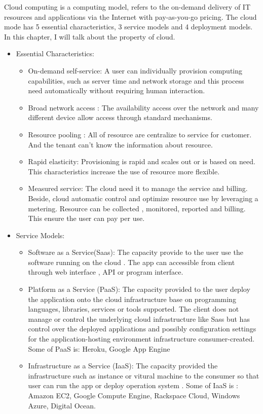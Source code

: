 
Cloud computing is a computing model, refers to the on-demand delivery of IT resources and applications via the Internet with pay-as-you-go pricing. The cloud mode has 5 essential characteristics, 3 service models and 4 deployment models. In this chapter, I will talk about the property of cloud. 
\begin{itemize}
	\item Essential Characteristics:
		\begin{itemize}
			\item On-demand self-service: A user can individually provision computing capabilities, such as server time and network storage and this process need automatically without requiring human interaction.
			\item Broad network access : The availability access over the network and many different device allow access through standard mechanisms. 
			\item Resource pooling : All of resource are centralize to service for customer. And the tenant can’t know the information about resource.
			\item Rapid elasticity: Provisioning is rapid and scales out or is based on need. This characteristics increase the use of resource more flexible. 
			\item Measured service: The cloud need it to manage the service and billing. Beside, cloud automatic control and optimize resource use by leveraging a metering. Resource can be collected , monitored, reported and billing. This ensure the user can pay per use. 
		\end{itemize}

\item Service Models:
	\begin{itemize}
		\item Software as a Service(Saas): The capacity provide to the user use the software running on the cloud . The app can  accessible from client through web interface , API or program interface.
		\item Platform as a Service (PaaS): The capacity provided to the user deploy the application onto the cloud infrastructure base on  programming languages, libraries, services or tools supported. The client does not manage or control the underlying cloud infrastructure like Sass but has control over the deployed applications and possibly configuration settings for the application-hosting environment infrastructure consumer-created. Some of  PaaS is: Heroku, Google App Engine
		\item Infrastructure as a Service (IaaS): The capacity provided the infrastructure such as instance or vitural machine to the consumer so that user can run the app or deploy operation system . Some of IaaS is : Amazon EC2, Google Compute Engine, Rackspace Cloud, Windows Azure, Digital Ocean.
	\end{itemize}


\end{itemize}
